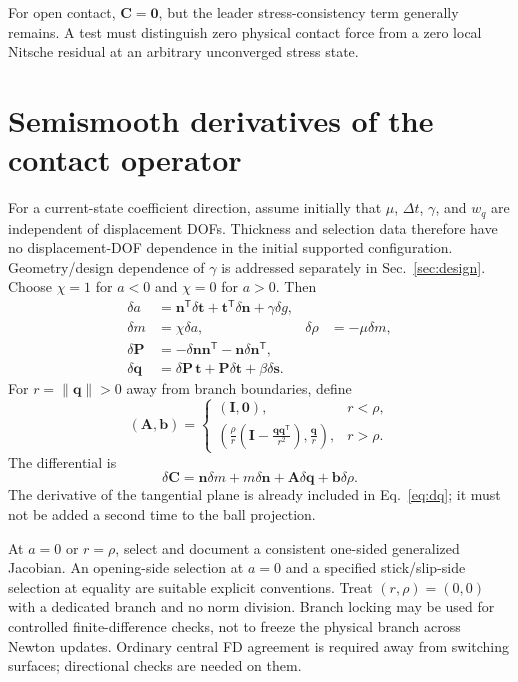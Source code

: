 \documentclass[11pt,a4paper]{article}
\newcommand{\tr}{^{\mathsf T}}
\newcommand{\Id}{\bm I}
\newcommand{\vn}{\bm n}
\newcommand{\vt}{\bm t}
\newcommand{\vq}{\bm q}
\newcommand{\vs}{\bm s}
\newcommand{\vC}{\bm C}
\newcommand{\Proj}{\bm P}
\begin{document}
For open contact, $\vC=\bm0$, but the leader stress-consistency term generally
remains. A test must distinguish zero physical contact force from a zero local
Nitsche residual at an arbitrary unconverged stress state.

\section{Semismooth derivatives of the contact operator}
For a current-state coefficient direction, assume initially that $\mu$,
$\Delta t$, $\gamma$, and $w_q$ are independent of displacement DOFs. Thickness
and selection data therefore have no displacement-DOF dependence in the initial
supported configuration. Geometry/design
dependence of $\gamma$ is addressed separately in Sec.~\ref{sec:design}.
Choose $\chi=1$ for $a<0$ and $\chi=0$ for $a>0$. Then
\begin{align}
 \delta a&=\vn\tr\delta\vt+\vt\tr\delta\vn+\gamma\delta g,\\
 \delta m&=\chi\delta a,& \delta\rho&=-\mu\delta m,\\
 \delta\Proj&=-\delta\vn\vn\tr-\vn\delta\vn\tr,\\
 \delta\vq&=\delta\Proj\,\vt+\Proj\delta\vt+\beta\delta\vs.
 \label{eq:dq}
\end{align}
For $r=\|\vq\|>0$ away from branch boundaries, define
\begin{equation}
 (\bm A,\bm b)=
 \begin{cases}
   (\Id,\bm0),&r<\rho,\\[3pt]
   \displaystyle\left(
     \frac{\rho}{r}\left(\Id-\frac{\vq\vq\tr}{r^2}\right),
     \frac{\vq}{r}\right),&r>\rho.
 \end{cases}
\end{equation}
The differential is
\begin{equation}\label{eq:dC}
 \delta\vC=\vn\delta m+m\delta\vn
            +\bm A\delta\vq+\bm b\delta\rho.
\end{equation}
The derivative of the tangential plane is already included in
Eq.~\eqref{eq:dq}; it must not be added a second time to the ball projection.

At $a=0$ or $r=\rho$, select and document a consistent one-sided generalized
Jacobian. An opening-side selection at $a=0$ and a specified stick/slip-side
selection at equality are suitable explicit conventions. Treat $(r,\rho)=(0,0)$
with a dedicated branch and no norm division. Branch locking may be used for
controlled finite-difference checks, not to freeze the physical branch across
Newton updates. Ordinary central FD agreement is required away from switching
surfaces; directional checks are needed on them.
\end{document}
